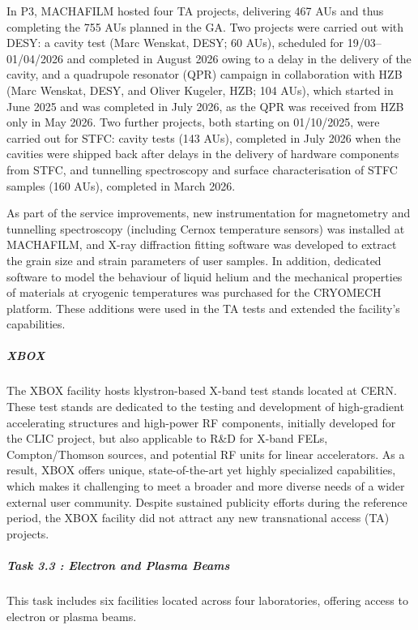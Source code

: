 In P3, MACHAFILM hosted four TA projects, delivering 467 AUs and thus completing the 755 AUs planned in the GA. Two projects were carried out with DESY: a cavity test (Marc Wenskat, DESY; 60 AUs), scheduled for 19/03--01/04/2026 and completed in August 2026 owing to a delay in the delivery of the cavity, and a quadrupole resonator (QPR) campaign in collaboration with HZB (Marc Wenskat, DESY, and Oliver Kugeler, HZB; 104 AUs), which started in June 2025 and was completed in July 2026, as the QPR was received from HZB only in May 2026. Two further projects, both starting on 01/10/2025, were carried out for STFC: cavity tests (143 AUs), completed in July 2026 when the cavities were shipped back after delays in the delivery of hardware components from STFC, and tunnelling spectroscopy and surface characterisation of STFC samples (160 AUs), completed in March 2026.

As part of the service improvements, new instrumentation for magnetometry and tunnelling spectroscopy (including Cernox temperature sensors) was installed at MACHAFILM, and X-ray diffraction fitting software was developed to extract the grain size and strain parameters of user samples. In addition, dedicated software to model the behaviour of liquid helium and the mechanical properties of materials at cryogenic temperatures was purchased for the CRYOMECH platform. These additions were used in the TA tests and extended the facility's capabilities.

\subparagraph{XBOX} \mbox{}

The XBOX facility hosts klystron-based X-band test stands located at CERN. These test stands are dedicated to the testing and development of high-gradient accelerating structures and high-power RF components, initially developed for the CLIC project, but also applicable to R\&D for X-band FELs, Compton/Thomson sources, and potential RF units for linear accelerators. As a result, XBOX offers unique, state-of-the-art yet highly specialized capabilities, which makes it challenging to meet a broader and more diverse needs of a wider external user community.
Despite sustained publicity efforts during the reference period, the XBOX facility did not attract any new transnational access (TA) projects. 

\subparagraph{Task 3.3 : Electron and Plasma Beams} \mbox{}


This task includes six facilities located across four laboratories, offering access to electron or plasma beams.

